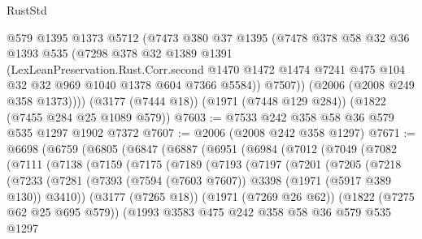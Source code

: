 \begin{lexlean}{RustStd}
\begin{coremodule}
{\begin{coremodule}
{{{{{{{{{{{{{        @579
        @1395
        @1373
        @5712
        (@7473
          @380
          @37
          @1395
          (@7478
            @378
            @58
            @32
            @36
            @1393
            @535
            (@7298
              @378
              @32
              @1389
              @1391
              (LexLeanPreservation.Rust.Corr.second
                @1470
                @1472
                @1474
                @7241
                @475
                @104
                @32
                @32
                @969
                @1040
                @1378
                @604
                @7366
                @5584))
            @7507))
        (@2006 (@2008 @249 @358 @1373))))
    (@3177 (@7444 @18))
    (@1971 (@7448 @129 @284))
    (@1822 (@7455 @284 @25 @1089 @579))
@7603 := @7533 @242 @358 @58 @36 @579 @535 @1297 @1902 @7372
@7607 := @2006 (@2008 @242 @358 @1297)
@7671 := @6698
    (@6759
      (@6805
        (@6847
          (@6887
            (@6951
              (@6984
                (@7012
                  (@7049
                    (@7082
                      (@7111
                        (@7138
                          (@7159
                            (@7175
                              (@7189
                                (@7193
                                  (@7197
                                    (@7201
                                      (@7205
                                        (@7218
                                          (@7233
                                            (@7281
                                              (@7393
                                                (@7594 (@7603 @7607))
                                                @3398
                                                (@1971 (@5917 @389 @130))
                                                @3410))
                                            (@3177 (@7265 @18))
                                            (@1971 (@7269 @26 @62))
                                            (@1822 (@7275 @62 @25 @695 @579))
                                            (@1993
                                              @3583
                                              @475
                                              @242
                                              @358
                                              @58
                                              @36
                                              @579
                                              @535
                                              @1297
}}}}}}}}}}}}}
\end{coremodule}}
\end{coremodule}
\end{lexlean}
